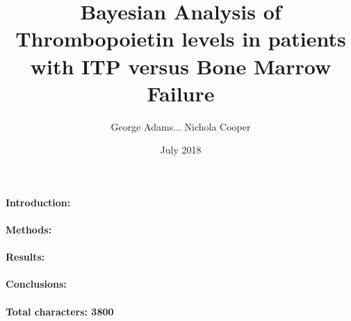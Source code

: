 \documentclass[11pt]{article}
\title{Bayesian Analysis of Thrombopoietin levels in patients with ITP versus Bone Marrow Failure}
\author{George Adams... Nichola Cooper}
\date{July 2018}
\begin{document}
\maketitle

\paragraph{Introduction:}
\paragraph{Methods:}
\paragraph{Results:}
\paragraph{Conclusions:}


\paragraph{}
\textbf{Total characters: 3800}
\end{document}
